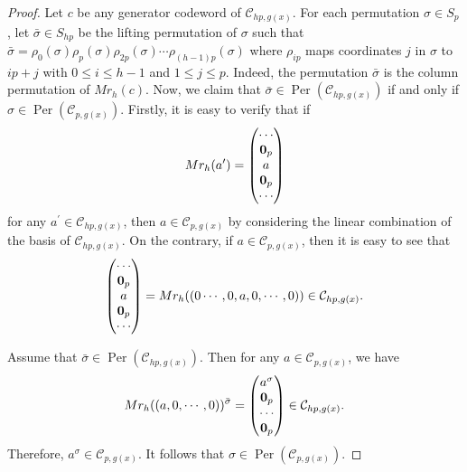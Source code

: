 \documentclass[10pt,a4paper]{amsart}
\begin{document}
\begin{proof}
    Let $c$ be any generator codeword of $\mathcal{C}_{hp,g(x)}$. For each permutation $\sigma\in S_p$, let $\bar{\sigma}\in S_{hp}$ be the lifting permutation of $\sigma$ such that $\bar{\sigma} = \rho_0(\sigma)\rho_p(\sigma)\rho_{2p}(\sigma)\cdots\rho_{(h-1)p}(\sigma)$ where $\rho_{ip}$ maps coordinates $j$ in $\sigma$ to $ip+j$ with $0\le i \le h-1$ and $1\le j \le p$. Indeed, the permutation $\bar{\sigma}$ is the column permutation of $Mr_{h}(c)$. Now, we claim that $\bar{\sigma}\in \operatorname{Per}(\mathcal{C}_{hp,g(x)})$ if and only if $\sigma\in \operatorname{Per}(\mathcal{C}_{p,g(x)})$. Firstly, it is easy to verify that if
    \[
        Mr_{h}(a^\prime) = \begin{pmatrix}
            \cdots \\
            {\bf 0}_p \\
            a \\
            {\bf 0}_p \\
            \cdots
        \end{pmatrix}
    \]
    for any $a^\prime\in\mathcal{C}_{hp,g(x)}$, then $a\in \mathcal{C}_{p,g(x)}$ by considering the linear combination of the basis of $\mathcal{C}_{hp,g(x)}$. On the contrary, if $a\in \mathcal{C}_{p,g(x)}$, then it is easy to see that
    \[
        \begin{pmatrix}
            \cdots \\
            {\bf 0}_p \\
            a \\
            {\bf 0}_p \\
            \cdots
        \end{pmatrix} = Mr_{h}((0\cdots,0,a,0,\cdots,0))\in\mathcal{C}_{hp,g(x)}.
    \]

    Assume that $\bar{\sigma}\in \operatorname{Per}(\mathcal{C}_{hp,g(x)})$. Then for any $a\in \mathcal{C}_{p,g(x)}$, we have
    \[
        Mr_{h}((a,0,\cdots,0))^{\bar{\sigma}} = \begin{pmatrix}
            a^\sigma \\
            {\bf 0}_p \\
            \cdots \\
            {\bf 0}_p
        \end{pmatrix}\in\mathcal{C}_{hp,g(x)}.
    \]
    Therefore, $a^\sigma\in\mathcal{C}_{p,g(x)}$. It follows that $\sigma\in \operatorname{Per}(\mathcal{C}_{p,g(x)})$. 


\end{proof}
\end{document}

